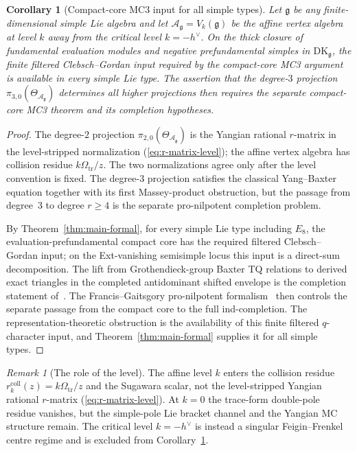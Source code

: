 \documentclass[11pt,reqno]{amsart}
\newtheorem{corollary}[theorem]{Corollary}
\theoremstyle{definition}
\theoremstyle{remark}
\newtheorem{remark}[theorem]{Remark}
\newcommand{\cA}{\mathcal{A}}
\newcommand{\fg}{\mathfrak{g}}
\newcommand{\DK}{\mathrm{DK}}
\numberwithin{equation}{section}
\begin{document}
\begin{corollary}[Compact-core MC3 input for all simple types]
\label{cor:mc3-all-types}
Let $\fg$ be any finite-dimensional simple Lie algebra and let
$\cA_\fg = V_k(\fg)$ be the affine vertex algebra at level $k$
away from the critical level $k = -h^\vee$. On the thick closure
of fundamental evaluation modules and negative prefundamental
simples in $\DK_\fg$, the finite filtered Clebsch--Gordan input
required by the compact-core MC3 argument is available in every
simple Lie type. The assertion that the degree-$3$ projection
$\pi_{3,0}(\Theta_{\cA_\fg})$ determines all higher projections
then requires the separate compact-core MC3 theorem and its
completion hypotheses.
\end{corollary}

\begin{proof}
The degree-$2$ projection $\pi_{2,0}(\Theta_{\cA_\fg})$ is the
Yangian rational $r$-matrix in the level-stripped normalization
(\ref{eq:r-matrix-level}); the affine vertex algebra has collision
residue $k\Omega_{\mathrm{tr}}/z$. The two normalizations agree
only after the level convention is fixed. The degree-$3$ projection
satisfies the classical Yang--Baxter equation together with its
first Massey-product obstruction, but the passage from degree~$3$
to degree $r \geq 4$ is the separate pro-nilpotent completion
problem.

By Theorem~\ref{thm:main-formal}, for every simple Lie type
including $E_8$, the evaluation-prefundamental compact core has the
required filtered Clebsch--Gordan input; on the Ext-vanishing
semisimple locus this input is a direct-sum decomposition. The
lift from Grothendieck-group Baxter TQ relations to derived exact
triangles in the completed antidominant shifted envelope is the
completion statement of~\cite[\S 8]{LorgatMKD}. The
Francis--Gaitsgory pro-nilpotent formalism~\cite{FG12} then
controls the separate passage from the compact core to the
full ind-completion. The representation-theoretic obstruction is
the availability of this finite filtered $q$-character input, and
Theorem~\ref{thm:main-formal} supplies it for all simple types.
\end{proof}

\begin{remark}[The role of the level]
\label{rem:level-mc3}
The affine level $k$ enters the collision residue
$r^{\mathrm{coll}}_k(z)=k\Omega_{\mathrm{tr}}/z$ and the
Sugawara scalar, not the level-stripped Yangian rational
$r$-matrix (\ref{eq:r-matrix-level}). At $k=0$ the trace-form
double-pole residue vanishes, but the simple-pole Lie bracket
channel and the Yangian MC structure remain. The critical level
$k=-h^\vee$ is instead a singular Feigin--Frenkel centre regime
and is excluded from Corollary~\ref{cor:mc3-all-types}.
\end{remark}
\end{document}
